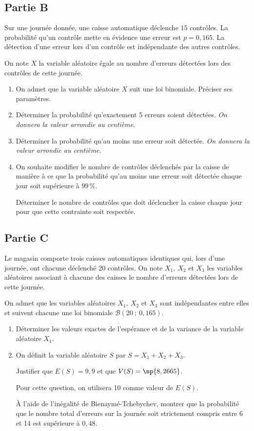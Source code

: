 \subsection*{Partie B}

Sur une journée donnée, une caisse automatique déclenche $15$ contrôles. La probabilité qu'un contrôle mette en évidence une erreur est $p = 0,165$. La détection d'une erreur lors d'un contrôle est indépendante des autres contrôles.

On note $X$ la variable aléatoire égale au nombre d'erreurs détectées lors des contrôles de cette journée.

\medskip

\begin{enumerate}
\item On admet que la variable aléatoire $X$ suit une loi binomiale. Préciser ses paramètres.
\item Déterminer la probabilité qu'exactement 5 erreurs soient détectées. \emph{On donnera la valeur arrondie au centième}.
\item Déterminer la probabilité qu'au moins une erreur soit détectée. \emph{On donnera la valeur arrondie au centième}.
\item On souhaite modifier le nombre de contrôles déclenchés par la caisse de manière à ce que la probabilité qu'au moins une erreur soit détectée chaque jour soit supérieure à $99\,\%$.

Déterminer le nombre de contrôles que doit déclencher la caisse chaque jour pour que cette contrainte soit respectée.
\end{enumerate}

\subsection*{Partie C}

Le magasin comporte trois caisses automatiques identiques qui, lors d'une journée, ont chacune déclenché $20$ contrôles. On note $X_1,\: X_2$ et $X_3$ les variables aléatoires associant à chacune des caisses le nombre d'erreurs détectées lors de cette journée.

On admet que les variables aléatoires $X_1,\: X_2$ et $X_3$ sont indépendantes entre elles et suivent chacune une loi binomiale $\mathcal{B}(20~;~0,165)$.

\medskip

\begin{enumerate}
\item Déterminer les valeurs exactes de l'espérance et de la variance de la variable aléatoire $X_1$.
\item On définit la variable aléatoire $S$ par $S = X_1 + X_2 + X_3$.

Justifier que $E(S) = 9,9$ et que $V(S) = \np{8,2665}$.

Pour cette question, on utilisera 10 comme valeur de $E(S)$.

À l'aide de l'inégalité de Bienaymé-Tchebychev, montrer que la probabilité que le nombre total d'erreurs sur la journée soit strictement compris entre 6 et 14 est supérieure à $0,48$.
\end{enumerate}

\bigskip
